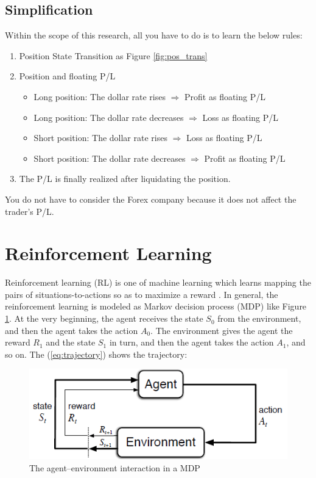 \subsection{Simplification}
Within the scope of this research, all you have to do is to learn the below rules:
\begin{enumerate}
  \item Position State Transition as Figure \ref{fig:pos_trans}
  \item Position and floating P/L
  \begin{itemize}
    \item Long position: The dollar rate rises $\Longrightarrow$ Profit as floating P/L
    \item Long position: The dollar rate decreases $\Longrightarrow$ Loss as floating P/L
    \item Short position: The dollar rate rises $\Longrightarrow$ Loss as floating P/L
    \item Short position: The dollar rate decreases $\Longrightarrow$ Profit as floating P/L
  \end{itemize}
  \item The P/L is finally realized after liquidating the position. 
\end{enumerate}
You do not have to consider the Forex company because it does not affect the trader's P/L.

\section{Reinforcement Learning}
Reinforcement learning (RL) is one of machine learning which learns mapping the pairs of situations-to-actions so as to maximize a reward \cite{sutton2018rl}. In general, the reinforcement learning is modeled as Markov decision process (MDP) like Figure \ref{fig:rl}. At the very beginning, the agent receives the state $ S_{0} $ from the environment, and then the agent takes the action $ A_{0} $. The environment gives the agent the reward $ R_{1} $ and the state $ S_{1} $ in turn, and then the agent takes the action $ A_{1} $, and so on. The (\ref{eq:trajectory}) shows the trajectory: 

\begin{figure}[htbp]
  \centering
  \includegraphics[scale=0.6]{./Figure/rl.png}
  \caption{The agent–environment interaction in a MDP \cite{sutton2018rl}}
  \label{fig:rl}
\end{figure}


